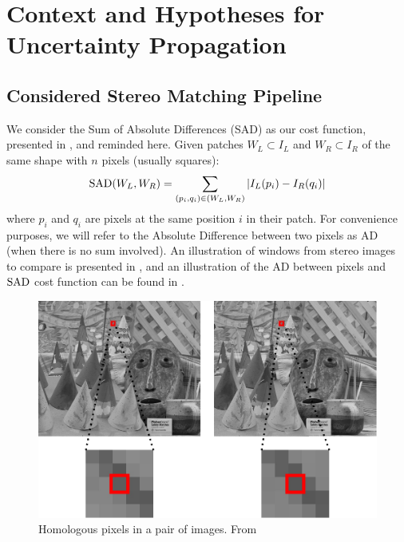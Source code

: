\section{Context and Hypotheses for Uncertainty Propagation }\label{sec:sources_of_uncertainty}
\subsection{Considered Stereo Matching Pipeline}
We consider the Sum of Absolute Differences (SAD) as our cost function, presented in , and reminded here. Given patches $W_L\subset I_L$ and $W_R\subset I_R$ of the same shape with $n$ pixels (usually squares):
\begin{align}
    \mathrm{SAD}(W_L, W_R) = \sum_{(p_i, q_i)\in (W_L, W_R)}|I_L(p_i) - I_R(q_i)|\label{eq:SAD}
\end{align}
where $p_i$ and $q_i$ are pixels at the same position $i$ in their patch. For convenience purposes, we will refer to the Absolute Difference between two pixels as AD (when there is no sum involved). An illustration of windows from stereo images to compare is presented in , and an illustration of the AD between pixels and $\mathrm{SAD}$ cost function can be found in .

\begin{figure}[ht]
  \centering
  \includegraphics[width=0.8\linewidth]{Images/Chap_4/Cones.png}
  \caption{Homologous pixels in a pair of images. From \cite{malinowski_uncertainty_2024}}\label{fig:Cones}
\end{figure}

